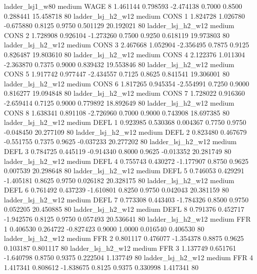        ladder_lsj1_w80     medium     WAGE                 8  1.461144 0.798593 -2.474138 0.7000 0.8500  0.288441   15.458718 80
     ladder_lsj_h2_w12     medium     CONS                 1  1.824728 1.026780 -0.675880 0.8125 0.9750  0.501129   20.192021 80
     ladder_lsj_h2_w12     medium     CONS                 2  1.728908 0.926104 -1.273260 0.7500 0.9250  0.618119   19.973803 80
     ladder_lsj_h2_w12     medium     CONS                 3  2.467668 1.052904 -2.356495 0.7875 0.9125  0.826487   19.803610 80
     ladder_lsj_h2_w12     medium     CONS                 4  2.122376 1.011304 -2.363870 0.7375 0.9000  0.839432   19.553846 80
     ladder_lsj_h2_w12     medium     CONS                 5  1.917742 0.977447 -2.434557 0.7125 0.8625  0.841541   19.306001 80
     ladder_lsj_h2_w12     medium     CONS                 6  1.817265 0.945354 -2.554991 0.7250 0.9000  0.816277   19.094848 80
     ladder_lsj_h2_w12     medium     CONS                 7  1.728022 0.916360 -2.659414 0.7125 0.9000  0.779892   18.892649 80
     ladder_lsj_h2_w12     medium     CONS                 8  1.638341 0.891108 -2.726960 0.7000 0.9000  0.743908   18.697385 80
     ladder_lsj_h2_w12     medium     DEFL                 1  0.923985 0.530368  0.004367 0.7750 0.9750 -0.048450   20.277109 80
     ladder_lsj_h2_w12     medium     DEFL                 2  0.823480 0.467679 -0.551755 0.7375 0.9625 -0.037233   20.277202 80
     ladder_lsj_h2_w12     medium     DEFL                 3  0.784725 0.445119 -0.914340 0.8000 0.9625 -0.013352   20.281749 80
     ladder_lsj_h2_w12     medium     DEFL                 4  0.755743 0.430272 -1.177907 0.8750 0.9625  0.007539   20.298648 80
     ladder_lsj_h2_w12     medium     DEFL                 5  0.746053 0.429291 -1.405181 0.8625 0.9750  0.026182   20.328175 80
     ladder_lsj_h2_w12     medium     DEFL                 6  0.761492 0.437239 -1.610801 0.8250 0.9750  0.042043   20.381159 80
     ladder_lsj_h2_w12     medium     DEFL                 7  0.773308 0.443403 -1.784326 0.8500 0.9750  0.052205   20.450885 80
     ladder_lsj_h2_w12     medium     DEFL                 8  0.791376 0.452717 -1.942576 0.8125 0.9750  0.057493   20.536641 80
     ladder_lsj_h2_w12     medium      FFR                 1  0.406530 0.264722 -0.827423 0.9000 1.0000  0.016540    0.406530 80
     ladder_lsj_h2_w12     medium      FFR                 2  0.801117 0.476077 -1.354378 0.8875 0.9625  0.103187    0.801117 80
     ladder_lsj_h2_w12     medium      FFR                 3  1.137749 0.651761 -1.640798 0.8750 0.9375  0.222504    1.137749 80
     ladder_lsj_h2_w12     medium      FFR                 4  1.417341 0.808612 -1.838675 0.8125 0.9375  0.330998    1.417341 80
